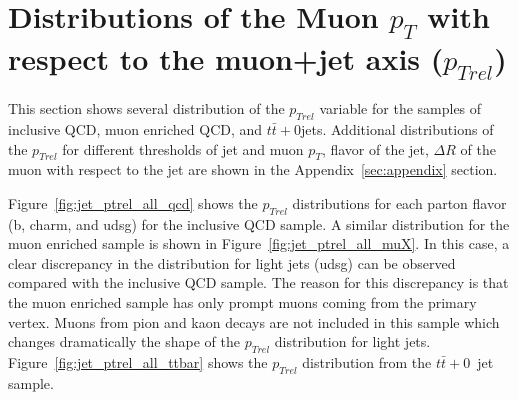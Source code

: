 \section{Distributions of the Muon $p_T$ with
respect to the muon+jet axis ($p_{Trel}$)}

This section shows several distribution of the $p_{Trel}$ variable
for the samples of inclusive QCD, muon enriched QCD, and $t\bar{t}+0$jets.
Additional distributions of the $p_{Trel}$ for different
thresholds of jet and muon $p_T$, flavor of the jet, $\Delta R$ of the
muon with respect to the jet are shown in the Appendix~\ref{sec:appendix} 
section.

Figure~\ref{fig:jet_ptrel_all_qcd} shows the $p_{Trel}$ distributions
for each parton flavor (b, charm, and udsg) for the inclusive QCD sample.
A similar distribution for the muon enriched sample is shown in
Figure~\ref{fig:jet_ptrel_all_muX}. In this case, a clear discrepancy in 
the distribution for light jets (udsg) can be observed compared with
the inclusive QCD sample. The reason for this discrepancy is that
the muon enriched sample has only prompt muons coming from the primary
vertex. Muons from pion and kaon decays are not included in this
sample which changes dramatically the shape of the $p_{Trel}$ distribution
for light jets. Figure~\ref{fig:jet_ptrel_all_ttbar} shows the 
$p_{Trel}$ distribution from the $t\bar{t}+0$~jet sample.


